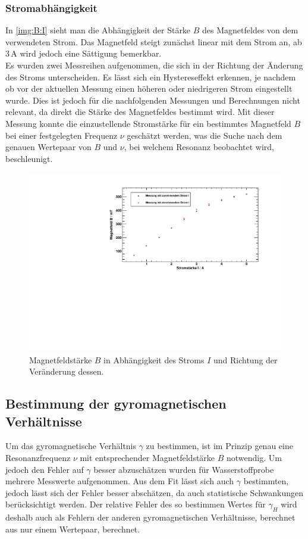 \subsubsection{Stromabhängigkeit}
In \autoref{img:B:I} sieht man die Abhängigkeit der Stärke $B$ des Magnetfeldes von dem verwendeten Strom. 
Das Magnetfeld steigt zunächst linear mit dem Strom an, ab 3\,A wird jedoch eine Sättigung bemerkbar. \\
Es wurden zwei Messreihen aufgenommen, die 
sich in der Richtung der Änderung des Stroms unterscheiden. Es lässt sich ein Hystereseffekt erkennen, je nachdem ob vor der aktuellen Messung 
einen höheren oder niedrigeren Strom eingestellt wurde. Dies ist jedoch für die nachfolgenden Messungen und Berechnungen nicht relevant, da direkt 
die Stärke des Magnetfeldes bestimmt wird. Mit dieser Messung konnte die einzustellende Stromstärke für ein bestimmtes Magnetfeld $B$ bei einer 
festgelegten Frequenz $\nu$ geschätzt werden, was die Suche nach dem genauen Wertepaar von $B$ und $\nu$, bei welchem Resonanz beobachtet wird, 
beschleunigt.
\begin{figure}[H]
\begin{center}
  \includegraphics[width=\textwidth]{../img/02-B-I.pdf}
  \caption{Magnetfeldstärke $B$ in Abhängigkeit des Stroms $I$ und Richtung der Veränderung dessen.}
  \label{img:B:I}
\end{center}
\end{figure}

\subsection{Bestimmung der gyromagnetischen Verhältnisse}
Um das gyromagnetische Verhältnis $\gamma$ zu bestimmen, ist im Prinzip genau eine Resonanzfrequenz $\nu$ mit entsprechender Magnetfeldstärke $B$ notwendig. 
Um jedoch den Fehler auf $\gamma$ besser abzuschätzen wurden für Wasserstoffprobe mehrere Messwerte aufgenommen. Aus dem Fit lässt sich auch $\gamma$ 
bestimmten, jedoch lässt sich der Fehler besser abschätzen, da auch statistische Schwankungen berücksichtigt werden. Der relative Fehler des so 
bestimmen Wertes für $\gamma_H$ wird deshalb auch als Fehlern der anderen gyromagnetischen Verhältnisse, berechnet aus nur einem Wertepaar, berechnet.
